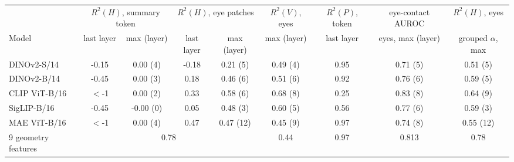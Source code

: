 \begin{tabular}{lcccccccc}
\toprule
 & \multicolumn{2}{c}{$R^2(H)$, summary token} & \multicolumn{2}{c}{$R^2(H)$, eye patches} & $R^2(V)$, eyes & $R^2(P)$, token & eye-contact AUROC & $R^2(H)$, eyes \\
Model & last layer & max (layer) & last layer & max (layer) & max (layer) & last layer & eyes, max (layer) & grouped $\alpha$, max \\
\midrule
DINOv2-S/14 & -0.15 & 0.00 (4) & -0.18 & 0.21 (5) & 0.49 (4) & 0.95 & 0.71 (5) & 0.51 (5) \\
DINOv2-B/14 & -0.45 & 0.00 (3) & 0.18 & 0.46 (6) & 0.51 (6) & 0.92 & 0.76 (6) & 0.59 (5) \\
CLIP ViT-B/16 & $<$-1 & 0.00 (2) & 0.33 & 0.58 (6) & 0.68 (8) & 0.25 & 0.83 (8) & 0.64 (9) \\
SigLIP-B/16 & -0.45 & -0.00 (0) & 0.05 & 0.48 (3) & 0.60 (5) & 0.56 & 0.77 (6) & 0.59 (3) \\
MAE ViT-B/16 & $<$-1 & 0.00 (4) & 0.47 & 0.47 (12) & 0.45 (9) & 0.97 & 0.74 (8) & 0.55 (12) \\
\midrule
9 geometry features & \multicolumn{4}{c}{0.78} & 0.44 & 0.97 & 0.813 & 0.78 \\
\bottomrule
\end{tabular}